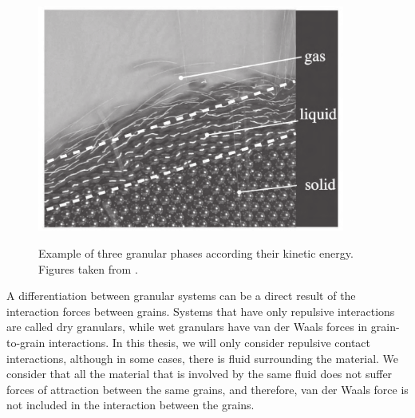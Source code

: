     \begin{figure}
        \centering
        \includegraphics[width=0.9\textwidth]{04-figuras/Exemplo_Fases.png}
        \label{fig:exemplo_fases}
        \caption{Example of three granular phases according their kinetic energy. Figures taken from \cite{Granular_Media_Between_Fluid_and_Solid}.}
    \end{figure}


    A differentiation between granular systems can be a direct result of the interaction forces between grains. Systems that have only repulsive interactions are called dry granulars, while wet granulars have van der Waals forces in grain-to-grain interactions. In this thesis, we will only consider repulsive contact interactions, although in some cases, there is fluid surrounding the material. We consider that all the material that is involved by the same fluid does not suffer forces of attraction between the same grains, and therefore, van der Waals force is not included in the interaction between the grains.


